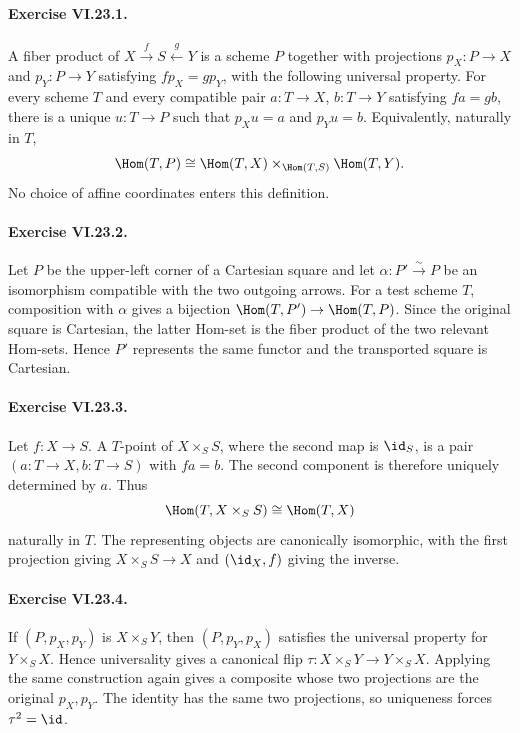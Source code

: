 \paragraph{Exercise VI.23.1.}
\begin{solution}
A fiber product of $X\xrightarrow fS\xleftarrow gY$ is a scheme $P$ together with projections
$p_X:P\to X$ and $p_Y:P\to Y$ satisfying $f p_X=g p_Y$, with the following universal property.
For every scheme $T$ and every compatible pair $a:T\to X$, $b:T\to Y$ satisfying
$f a=g b$, there is a unique $u:T\to P$ such that $p_Xu=a$ and $p_Yu=b$.  Equivalently,
naturally in $T$,
\[
\Hom(T,P)\cong\Hom(T,X)\times_{\Hom(T,S)}\Hom(T,Y).
\]
No choice of affine coordinates enters this definition.
\end{solution}

\paragraph{Exercise VI.23.2.}
\begin{solution}
Let $P$ be the upper-left corner of a Cartesian square and let $\alpha:P'\xrightarrow{\sim}P$ be
an isomorphism compatible with the two outgoing arrows.  For a test scheme $T$, composition with
$\alpha$ gives a bijection $\Hom(T,P')\to\Hom(T,P)$.  Since the original square is Cartesian,
the latter Hom-set is the fiber product of the two relevant Hom-sets.  Hence $P'$ represents the
same functor and the transported square is Cartesian.
\end{solution}

\paragraph{Exercise VI.23.3.}
\begin{solution}
Let $f:X\to S$.  A $T$-point of $X\times_S S$, where the second map is $\id_S$, is a pair
$(a:T\to X,b:T\to S)$ with $f a=b$.  The second component is therefore uniquely determined by
$a$.  Thus
\[
\Hom(T,X\times_SS)\cong\Hom(T,X)
\]
naturally in $T$.  The representing objects are canonically isomorphic, with the first projection
giving $X\times_SS\to X$ and $(\id_X,f)$ giving the inverse.
\end{solution}

\paragraph{Exercise VI.23.4.}
\begin{solution}
If $(P,p_X,p_Y)$ is $X\times_SY$, then $(P,p_Y,p_X)$ satisfies the universal property for
$Y\times_SX$.  Hence universality gives a canonical flip
$\tau:X\times_SY\to Y\times_SX$.  Applying the same construction again gives a composite whose
two projections are the original $p_X,p_Y$.  The identity has the same two projections, so
uniqueness forces $\tau^2=\id$.
\end{solution}

